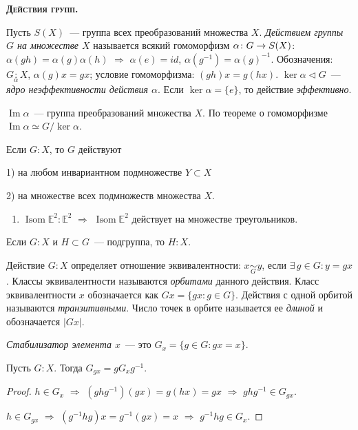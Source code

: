 \documentclass[a4paper]{article}
\newcommand*{\tema}[1]{\vspace{20pt}
\begin{center}{\textbf{\textsc{#1.}}}\vspace{5pt}
\end{center}}
\newcommand{\Isom}{\mathop{\mathrm{Isom}}\nolimits}
\renewcommand{\Im}{\mathop{\mathrm{Im}}\nolimits}
\newcommand*{\p}[1]{#1\nobreak\discretionary{}{\hbox{$\mathsurround=0pt #1$}}{}}
\begin{document}
\tema{Действия групп}

Пусть $S(X)$~--- группа всех преобразований множества $X$.
\emph{Действием группы $G$ на множестве $X$} называется всякий
гомоморфизм $\alpha\colon G\p\to S(X)$:
$\alpha(gh)=\alpha(g)\alpha(h)$ $\Rightarrow$ $\alpha(e)=id$,
$\alpha(g^{-1})=\alpha(g)^{-1}$. Обозначения:
$G\mathop{:}\limits_\alpha X$, $\alpha(g)x=gx$; условие
гомоморфизма: $(gh)x=g(hx)$. $\ker\alpha\triangleleft G$~---
\emph{ядро неэффективности действия $\alpha$}. Если
$\ker\alpha=\{e\}$, то действие \emph{эффективно}.

$\Im\alpha$~--- группа преобразований множества $X$. По теореме о
гомоморфизме $\Im\alpha\simeq G/\ker\alpha$.

Если $G:X$, то $G$ действуют

1) на любом инвариантном подмножестве $Y\subset X$

2) на множестве всех подмножеств множества $X$.

\prim
\begin{enumerate}
  \item $\Isom\mathbb{E}^2:\mathbb{E}^2$ $\Rightarrow$ $\Isom
  \mathbb{E}^2$ действует на множестве треугольников.
\end{enumerate}

Если $G:X$ и $H\subset G$~--- подгруппа, то $H:X$.

Действие $G:X$ определяет отношение эквивалентности:
$x\mathop{\sim}\limits_Gy$, если $\exists \, g\in G: y=gx$. Классы
эквивалентности называются \emph{орбитами} данного действия. Класс
эквивалентности $x$ обозначается как $Gx=\{gx:g\in G\}$. Действия с
одной орбитой называются \emph{транзитивными}. Число точек в орбите
называется ее \emph{длиной} и обозначается $|Gx|$.

\emph{Стабилизатор элемента $x$}~--- это $G_x=\{g\in G: gx=x\}$.

\begin{theorem}
Пусть $G:X$. Тогда $G_{gx}=gG_xg^{-1}$.
\end{theorem}

\begin{proof}
$h\in G_x$ $\Rightarrow$ $(ghg^{-1})(gx)=g(hx)=gx$ $\Rightarrow$
$ghg^{-1}\in G_{gx}$.

$h\in G_{gx}$ $\Rightarrow$ $(g^{-1}hg)x=g^{-1}(gx)=x$ $\Rightarrow$
$g^{-1}hg\in G_x$.
\end{proof}
\end{document}
